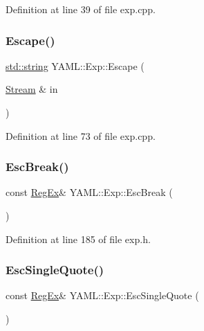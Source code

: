 Definition at line 39 of file exp.\+cpp.

\mbox{\label{namespace_y_a_m_l_1_1_exp_a8bf36f44c2818347e3866895fc77ff60}} 
\subsubsection{\texorpdfstring{Escape()}{Escape()}\hspace{0.1cm}{\footnotesize\ttfamily [2/2]}}
{\footnotesize\ttfamily \mbox{\hyperlink{glad_8h_ac83513893df92266f79a515488701770}{std\+::string}} Y\+A\+M\+L\+::\+Exp\+::\+Escape (\begin{DoxyParamCaption}\item[{\mbox{\hyperlink{class_y_a_m_l_1_1_stream}{Stream}} \&}]{in }\end{DoxyParamCaption})}



Definition at line 73 of file exp.\+cpp.

\mbox{\label{namespace_y_a_m_l_1_1_exp_aa025e6598b92e5e5eff13736eba4b325}} 
\subsubsection{\texorpdfstring{EscBreak()}{EscBreak()}}
{\footnotesize\ttfamily const \mbox{\hyperlink{class_y_a_m_l_1_1_reg_ex}{Reg\+Ex}}\& Y\+A\+M\+L\+::\+Exp\+::\+Esc\+Break (\begin{DoxyParamCaption}{ }\end{DoxyParamCaption})\hspace{0.3cm}{\ttfamily [inline]}}



Definition at line 185 of file exp.\+h.

\mbox{\label{namespace_y_a_m_l_1_1_exp_a2bd56c19ae80e5c410a775f95270d2e4}} 
\subsubsection{\texorpdfstring{EscSingleQuote()}{EscSingleQuote()}}
{\footnotesize\ttfamily const \mbox{\hyperlink{class_y_a_m_l_1_1_reg_ex}{Reg\+Ex}}\& Y\+A\+M\+L\+::\+Exp\+::\+Esc\+Single\+Quote (\begin{DoxyParamCaption}{ }\end{DoxyParamCaption})\hspace{0.3cm}{\ttfamily [inline]}}



